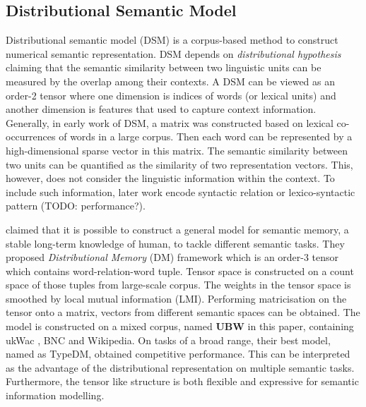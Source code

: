 \documentclass[a4paper]{article}
\begin{document}
\subsection{Distributional Semantic Model} \label{sec:dsm}
Distributional semantic model (DSM) is a corpus-based method to construct numerical semantic representation. DSM depends on \textit{distributional hypothesis} \citep{harris1954distributional, miller1991contextual} claiming that the semantic similarity between two linguistic units can be measured by the overlap among their contexts. A DSM can be viewed as an order-2 tensor where one dimension is indices of words (or lexical units) and another dimension is features that used to capture context information. Generally, in early work of DSM, a matrix was constructed based on lexical co-occurrences of words in a large corpus. Then each word can be represented by a high-dimensional sparse vector in this matrix. The semantic similarity between two units can be quantified as the similarity of two representation vectors. This, however, does not consider the linguistic information within the context. To include such information, later work encode syntactic relation or lexico-syntactic pattern \citep{pado2007integration, erk2008structured, rothenhausler2009unsupervised} (TODO: performance?). 

\citet{baroni2010distributional} claimed that it is possible to construct a general model for semantic memory, a stable long-term knowledge of human, to tackle different semantic tasks. They proposed \textit{Distributional Memory} (DM) framework which is an order-3 tensor which contains word-relation-word tuple. Tensor space is constructed on a count space of those tuples from large-scale corpus. The weights in the tensor space is smoothed by local mutual information (LMI). Performing matricisation on the tensor onto a matrix, vectors from different semantic spaces can be obtained. The model is constructed on a mixed corpus, named \textbf{UBW} in this paper, containing ukWac  \citep{ferraresi2008introducing}, BNC \citep{british2007british} and Wikipedia. On tasks of a broad range, their best model, named as TypeDM, obtained competitive performance. This can be interpreted as the advantage of the distributional representation on multiple semantic tasks. Furthermore, the tensor like structure is both flexible and expressive for semantic information modelling. 
\end{document}
